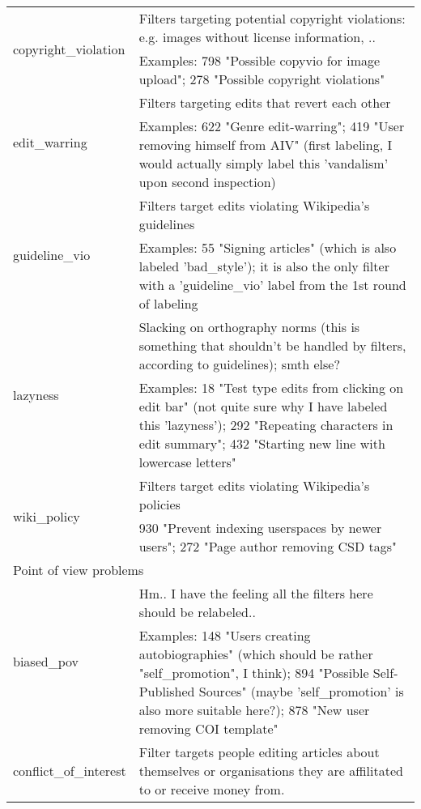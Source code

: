 \begin{longtable}{ | p{5cm} | p{9cm} | }
    \hline
    \multirow{2}{*}{copyright\_violation} & Filters targeting potential copyright violations: e.g. images without license information, ..\\
                                     & Examples: 798 "Possible copyvio for image upload"; 278 "Possible copyright violations"\\
    \hline
    \multirow{2}{*}{edit\_warring} & Filters targeting edits that revert each other \\
                                     & Examples: 622 "Genre edit-warring"; 419 "User removing himself from AIV" (first labeling, I would actually simply label this 'vandalism' upon second inspection)\\
    \hline
    \multirow{2}{*}{guideline\_vio} &  Filters target edits violating Wikipedia's guidelines \\%
                                     & Examples: 55 "Signing articles" (which is also labeled 'bad\_style'); it is also the only filter with a 'guideline\_vio' label from the 1st round of labeling\\
    \hline
    \multirow{2}{*}{lazyness} & Slacking on orthography norms (this is something that shouldn't be handled by filters, according to guidelines); smth else?\\
                                     & Examples: 18 "Test type edits from clicking on edit bar" (not quite sure why I have labeled this 'lazyness'); 292 "Repeating characters in edit summary"; 432 "Starting new line with lowercase letters"\\
    \hline
    \multirow{2}{*}{wiki\_policy} & Filters target edits violating Wikipedia's policies\\
                                     & 930 "Prevent indexing userspaces by newer users"; 272 "Page author removing CSD tags"\\
    \hline \hline
        \multicolumn{2}{|l|}{Point of view problems} \\
    \hline
    \multirow{2}{*}{biased\_pov} & Hm.. I have the feeling all the filters here should be relabeled..\\
                                     & Examples: 148 "Users creating autobiographies" (which should be rather "self\_promotion", I think); 894 "Possible Self-Published Sources" (maybe 'self\_promotion' is also more suitable here?); 878 "New user removing COI template"\\
    \hline
    \multirow{2}{*}{conflict\_of\_interest} & Filter targets people editing articles about themselves or organisations they are affilitated to or receive money from.\\

\end{longtable}
